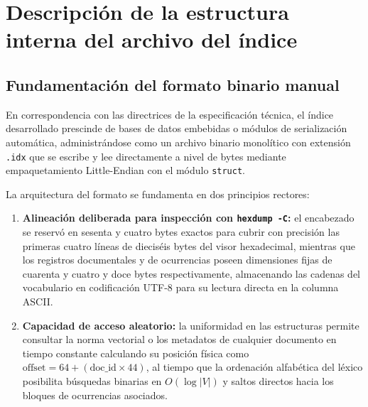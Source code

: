\documentclass[11pt,spanish]{article}
\begin{document}
\section{Descripción de la estructura interna del archivo del índice}
\label{sec:estructura-binaria}

\subsection{Fundamentación del formato binario manual}

En correspondencia con las directrices de la especificación técnica, el índice desarrollado prescinde de bases de datos embebidas o módulos de serialización automática, administrándose como un archivo binario monolítico con extensión \texttt{.idx} que se escribe y lee directamente a nivel de bytes mediante empaquetamiento Little-Endian con el módulo \texttt{struct}.

La arquitectura del formato se fundamenta en dos principios rectores:
\begin{enumerate}
    \item \textbf{Alineación deliberada para inspección con \texttt{hexdump -C}:} el encabezado se reservó en sesenta y cuatro bytes exactos para cubrir con precisión las primeras cuatro líneas de dieciséis bytes del visor hexadecimal, mientras que los registros documentales y de ocurrencias poseen dimensiones fijas de cuarenta y cuatro y doce bytes respectivamente, almacenando las cadenas del vocabulario en codificación UTF-8 para su lectura directa en la columna ASCII.
    \item \textbf{Capacidad de acceso aleatorio:} la uniformidad en las estructuras permite consultar la norma vectorial o los metadatos de cualquier documento en tiempo constante calculando su posición física como $\text{offset} = 64 + (\text{doc\_id} \times 44)$, al tiempo que la ordenación alfabética del léxico posibilita búsquedas binarias en $O(\log |V|)$ y saltos directos hacia los bloques de ocurrencias asociados.
\end{enumerate}
\end{document}
